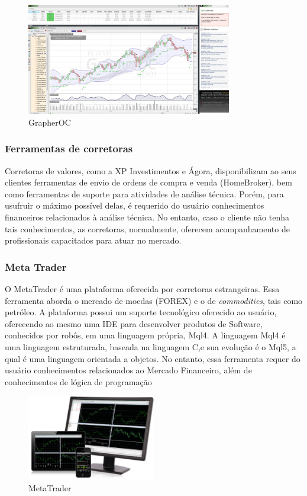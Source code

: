 \begin{figure}[h]
\centering
\label{f03}
\includegraphics[width=0.8\textwidth]{figuras/f03}
\caption{GrapherOC}

\end{figure}

\subsubsection{Ferramentas de corretoras}

Corretoras de valores, como a XP Investimentos e Ágora, disponibilizam ao seus clientes ferramentas de envio de ordens de compra e venda (HomeBroker), bem como ferramentas de suporte para atividades de análise técnica. Porém, para usufruir o máximo possível delas, é requerido do usuário conhecimentos financeiros relacionados à análise técnica. No entanto, caso o cliente não tenha tais conhecimentos, as corretoras, normalmente, oferecem acompanhamento de profissionais capacitados para atuar no mercado.

\subsubsection{Meta Trader}

O MetaTrader é uma plataforma oferecida por corretoras estrangeiras. Essa ferramenta aborda o mercado de moedas (FOREX) e o de \textit{commodities}, tais como petróleo. A plataforma possui um suporte tecnológico oferecido ao usuário, oferecendo ao mesmo uma IDE para desenvolver produtos de Software, conhecidos por robôs, em uma linguagem própria, Mql4. A linguagem Mql4 é uma linguagem estruturada, baseada na linguagem C,e sua evolução é o Mql5, a qual é uma linguagem orientada a objetos. No entanto, essa ferramenta requer do usuário conhecimentos relacionados ao Mercado Financeiro, além de conhecimentos de lógica de programação

\begin{figure}[h]
\centering
\label{f04}
\includegraphics[width=0.5\textwidth]{figuras/f04}
\caption{MetaTrader}

\end{figure}


